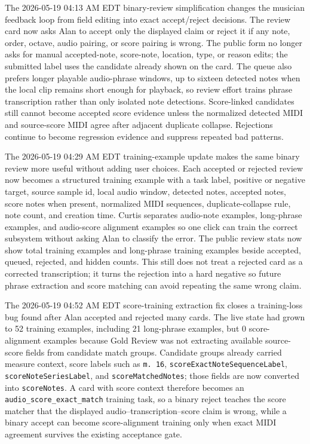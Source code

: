 \documentclass[12pt,letterpaper]{article}
\begin{document}
The 2026-05-19 04:13 AM EDT binary-review simplification changes the musician feedback loop from field editing into exact accept/reject decisions. The review card now asks Alan to accept only the displayed claim or reject it if any note, order, octave, audio pairing, or score pairing is wrong. The public form no longer asks for manual accepted-note, score-note, location, type, or reason edits; the submitted label uses the candidate already shown on the card. The queue also prefers longer playable audio-phrase windows, up to sixteen detected notes when the local clip remains short enough for playback, so review effort trains phrase transcription rather than only isolated note detections. Score-linked candidates still cannot become accepted score evidence unless the normalized detected MIDI and source-score MIDI agree after adjacent duplicate collapse. Rejections continue to become regression evidence and suppress repeated bad patterns.

The 2026-05-19 04:29 AM EDT training-example update makes the same binary review more useful without adding user choices. Each accepted or rejected review now becomes a structured training example with a task label, positive or negative target, source sample id, local audio window, detected notes, accepted notes, score notes when present, normalized MIDI sequences, duplicate-collapse rule, note count, and creation time. Curtis separates audio-note examples, long-phrase examples, and audio-score alignment examples so one click can train the correct subsystem without asking Alan to classify the error. The public review stats now show total training examples and long-phrase training examples beside accepted, queued, rejected, and hidden counts. This still does not treat a rejected card as a corrected transcription; it turns the rejection into a hard negative so future phrase extraction and score matching can avoid repeating the same wrong claim.

The 2026-05-19 04:52 AM EDT score-training extraction fix closes a training-loss bug found after Alan accepted and rejected many cards. The live state had grown to 52 training examples, including 21 long-phrase examples, but 0 score-alignment examples because Gold Review was not extracting available source-score fields from candidate match groups. Candidate groups already carried measure context, score labels such as \texttt{m. 16}, \texttt{scoreExactNoteSequenceLabel}, \texttt{scoreNoteSeriesLabel}, and \texttt{scoreMatchedNotes}; those fields are now converted into \texttt{scoreNotes}. A card with score context therefore becomes an \texttt{audio\_score\_exact\_match} training task, so a binary reject teaches the score matcher that the displayed audio--transcription--score claim is wrong, while a binary accept can become score-alignment training only when exact MIDI agreement survives the existing acceptance gate.
\end{document}

